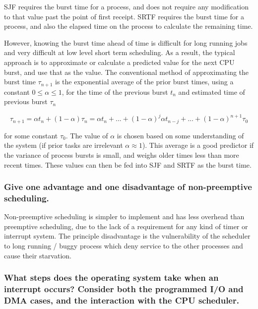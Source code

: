 \documentclass[]{article}
\begin{document}
        SJF requires the burst time for a process, and does not require any modification to that value past the point of first receipt.
        SRTF requires the burst time for a process, and also the elapsed time on the process to calculate the remaining time.

        However, knowing the burst time ahead of time is difficult for long running jobs and very difficult at low level short term scheduling. As a result, the typical approach is to approximate or calculate a predicted value for the next CPU burst, and use that as the value. The conventional method of approximating the burst time $\tau_{n+1}$ is the exponential average of the prior burst times, using a constant $0\leq\alpha\leq 1$, for the time of the previous burst $t_{n}$ and estimated time of previous burst $\tau_{n}$

        \begin{equation}
            \tau_{n+1} = \alpha t_{n} + (1 - \alpha)\tau_{n}
                       = \alpha t_{n} + ... + (1 - \alpha)^{j}\alpha t_{n-j} + ... + (1 - \alpha)^{n + 1}\tau_{0}
        \end{equation}

        for some constant $\tau_{0}$. The value of $\alpha$ is chosen based on some understanding of the system (if prior tasks are irrelevant $\alpha\approx 1$). This average is a good predictor if the variance of process bursts is small, and weighs older times less than more recent times. These values can then be fed into SJF and SRTF as the burst time.

        \subsubsection{Give one advantage and one disadvantage of non-preemptive scheduling.}

        Non-preemptive scheduling is simpler to implement and has less overhead than preemptive scheduling, due to the lack of a requirement for any kind of timer or interrupt system. The principle disadvantage is the vulnerability of the scheduler to long running / buggy process which deny service to the other processes and cause their starvation.

        \subsubsection{What steps does the operating system take when an interrupt occurs? Consider both the programmed I/O and DMA cases, and the interaction with the CPU scheduler.}
\end{document}

